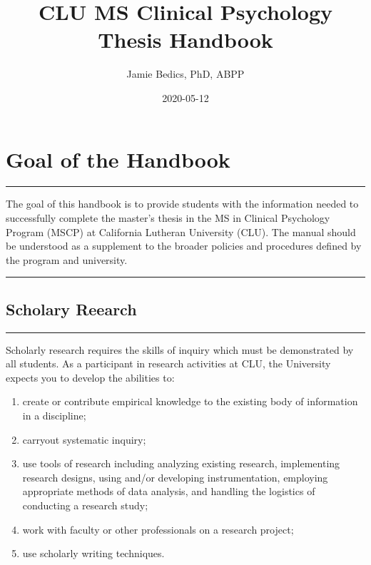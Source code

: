 \documentclass[openany]{book}
\title{CLU MS Clinical Psychology Thesis Handbook}
\author{Jamie Bedics, PhD, ABPP}
\date{2020-05-12}
\providecommand{\tightlist}{%
  \setlength{\itemsep}{0pt}\setlength{\parskip}{0pt}}
\begin{document}
\maketitle

{
\setcounter{tocdepth}{1}
\tableofcontents
}
\hypertarget{goal-of-the-handbook}{%
\chapter{Goal of the Handbook}\label{goal-of-the-handbook}}

\begin{center}\rule{0.5\linewidth}{0.5pt}\end{center}

The goal of this handbook is to provide students with the information needed to successfully complete the master's thesis in the MS in Clinical Psychology Program (MSCP) at California Lutheran University (CLU). The manual should be understood as a supplement to the broader policies and procedures defined by the program and university.

\begin{center}\rule{0.5\linewidth}{0.5pt}\end{center}

\hypertarget{scholary-reearch}{%
\section{Scholary Reearch}\label{scholary-reearch}}

\begin{center}\rule{0.5\linewidth}{0.5pt}\end{center}

Scholarly research requires the skills of inquiry which must be demonstrated by all students. As a participant in research activities at CLU, the University expects you to develop the abilities to:

\begin{enumerate}
\def\labelenumi{\arabic{enumi}.}
\tightlist
\item
  create or contribute empirical knowledge to the existing body of information in a discipline;
\item
  carryout systematic inquiry;
\item
  use tools of research including analyzing existing research, implementing research designs, using and/or developing instrumentation, employing appropriate methods of data analysis, and handling the logistics of conducting a research study;
\item
  work with faculty or other professionals on a research project;
\item
  use scholarly writing techniques.
\end{enumerate}
\end{document}
